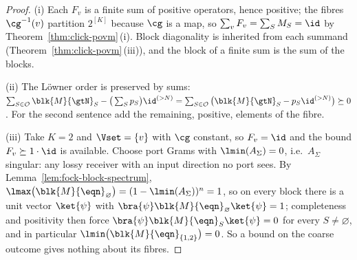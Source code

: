 \begin{proof}
(i) Each $F_v$ is a finite sum of positive operators, hence positive; the
fibres $\cg^{-1}(v)$ partition $2^{[K]}$ because $\cg$ is a map, so
$\sum_vF_v=\sum_SM_S=\id$ by Theorem~\ref{thm:click-povm}\,(i). Block diagonality is
inherited from each summand (Theorem~\ref{thm:click-povm}\,(iii)), and the block of a
finite sum is the sum of the blocks.

(ii) The Löwner order is preserved by sums:
$\sum_{S\in\mathcal{O}}\blk{M}{\gtN}_S-\big(\sum_Sp_S\big)\id^{(>N)}
=\sum_{S\in\mathcal{O}}\big(\blk{M}{\gtN}_S-p_S\id^{(>N)}\big)\succeq0$. For
the second sentence add the remaining, positive, elements of the fibre.

(iii) Take $K=2$ and $\Vset=\{v\}$ with $\cg$ constant, so $F_v=\id$ and the
bound $F_v\succeq1\cdot\id$ is available. Choose port Grams with
$\lmin(A_\Sigma)=0$, i.e.\ $A_\Sigma$ singular: any lossy receiver with an
input direction no port sees. By Lemma~\ref{lem:fock-block-spectrum},
$\lmax\big(\blk{M}{\eqn}_{\varnothing}\big)=(1-\lmin(A_\Sigma))^n=1$, so on
every block there is a unit vector $\ket{\psi}$ with
$\bra{\psi}\blk{M}{\eqn}_{\varnothing}\ket{\psi}=1$; completeness and
positivity then force
$\bra{\psi}\blk{M}{\eqn}_{S}\ket{\psi}=0$ for every $S\ne\varnothing$, and in
particular $\lmin\big(\blk{M}{\eqn}_{\{1,2\}}\big)=0$. So a bound on the
coarse outcome gives nothing about its fibres.
\end{proof}
